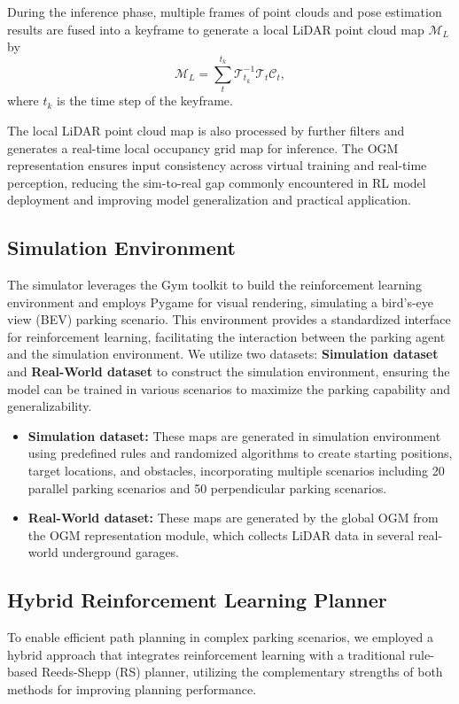 \documentclass[ conference]{./support/ieeeconf}
\begin{document}
During the inference phase, multiple frames of point clouds and pose estimation results are fused into a keyframe to generate a local LiDAR point cloud map $\mathcal{M}_L$ by 
\begin{equation}
\mathcal{M}_L = \sum_{t}^{t_k} \mathcal{T}_{t_k}^{-1} \mathcal{T}_t \mathcal{C}_t,
\end{equation}
where $t_k$ is the time step of the keyframe.
 
The local LiDAR point cloud map is also processed by further filters and generates a real-time local occupancy grid map for inference.
The OGM representation ensures input consistency across virtual training and real-time perception, reducing the sim-to-real gap commonly encountered in RL model deployment and improving model generalization and practical application.



\subsection{Simulation Environment}
The simulator leverages the Gym toolkit to build the reinforcement learning environment and employs Pygame for visual rendering, simulating a bird's-eye view (BEV) parking scenario. 
This environment provides a standardized interface for reinforcement learning, facilitating the interaction between the parking agent and the simulation environment.
We utilize two datasets: \textbf{Simulation dataset} and \textbf{Real-World dataset} to construct the simulation environment, ensuring the model can be trained in various scenarios to maximize the parking capability and generalizability.
\begin{itemize}
    \item \textbf{Simulation dataset:} These maps are generated in simulation environment using predefined rules and randomized algorithms to create starting positions, target locations, and obstacles, incorporating multiple scenarios including 20 parallel parking scenarios and 50 perpendicular parking scenarios.
    \item \textbf{Real-World dataset:} These maps are generated by the global OGM from the OGM representation module, which collects LiDAR data in several real-world underground garages.
\end{itemize}



\subsection{Hybrid Reinforcement Learning Planner}
To enable efficient path planning in complex parking scenarios, we employed a hybrid approach that integrates reinforcement learning with a traditional rule-based Reeds-Shepp (RS) planner, utilizing the complementary strengths of both methods for improving planning performance.
\end{document}
